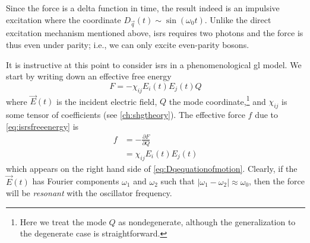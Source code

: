 Since the force is a delta function in time, the result indeed is an impulsive excitation where the coordinate $D_{\vec{q}}(t)\sim\sin(\omega_0t)$.
Unlike the direct excitation mechanism mentioned above, \gls{isrs} requires two photons and the force is thus even under parity; i.e., we can only excite even-parity bosons.

It is instructive at this point to consider \gls{isrs} in a phenomenological \gls{gl} model.
We start by writing down an effective free energy\citep{stevens_coherent_2002}
\begin{equation}\label{eq:isrsfreeenergy}
F = -\chi_{ij}E_i(t)E_j(t)Q
\end{equation}
where $\vec{E}(t)$ is the incident electric field, $Q$ the mode coordinate,\footnote{Here we treat the mode $Q$ as nondegenerate, although the generalization to the degenerate case is straightforward.} and $\chi_{ij}$ is some tensor of coefficients (see \cref{ch:shgtheory}).
The effective force $f$ due to \cref{eq:isrsfreeenergy} is
\begin{align}
f &= -\frac{\partial F}{\partial Q}\\
&= \chi_{ij}E_i(t)E_j(t)
\end{align}
which appears on the right hand side of \cref{eq:Dqequationofmotion}.
Clearly, if the $\vec{E}(t)$ has Fourier components $\omega_1$ and $\omega_2$ such that $|\omega_1-\omega_2|\approx\omega_0$, then the force will be \emph{resonant} with the oscillator frequency.

